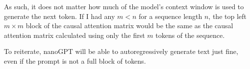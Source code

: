 \documentclass{article} %
\theoremstyle{definition}
\begin{document}
As such, it does not matter how much of the model's context window is used
to generate the next token. If I had any $m < n$ for a sequence length $n$, 
the top left $m \times m$ block of the causal attention matrix would be the same 
as the causal attention matrix calculated using only the first $m$ tokens
of the sequence.

To reiterate, nanoGPT will be able to autoregressively generate text
just fine, even if the prompt is not a full block of tokens.
\end{document}
